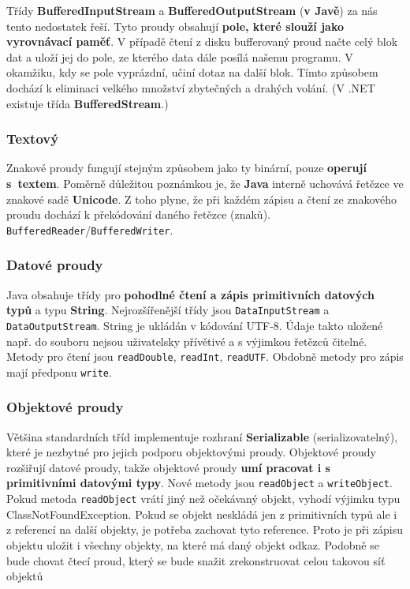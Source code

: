 Třídy \textbf{BufferedInputStream} a \textbf{BufferedOutputStream} (\textbf{v Javě}) za nás tento nedostatek řeší. Tyto proudy obsahují \textbf{pole, které slouží jako vyrovnávací paměť}. V případě čtení z disku bufferovaný proud načte celý blok dat a uloží jej do pole, ze kterého data dále posílá našemu programu. V okamžiku, kdy se pole vyprázdní, učiní dotaz na další blok. Tímto způsobem dochází k eliminaci velkého množství zbytečných a drahých volání. (V .NET existuje třída \textbf{BufferedStream}.)

\subsubsection{Textový}
Znakové proudy fungují stejným způsobem jako ty binární, pouze \textbf{operují s textem}. Poměrně důležitou poznámkou je, že \textbf{Java} interně uchovává řetězce ve znakové sadě \textbf{Unicode}. Z toho plyne, že při každém zápisu a čtení ze znakového proudu dochází k překódování daného řetězce (znaků). \texttt{BufferedReader}/\texttt{BufferedWriter}.

\subsubsection{Datové proudy}
Java obsahuje třídy pro \textbf{pohodlné čtení a zápis primitivních datových typů} a typu \textbf{String}. Nejrozšířenější třídy jsou \texttt{DataInputStream} a \texttt{DataOutputStream}. String je ukládán v kódování UTF-8. Údaje takto uložené např. do souboru nejsou uživatelsky přívětivé a s výjimkou řetězců čitelné. Metody pro čtení jsou \texttt{readDouble}, \texttt{readInt}, \texttt{readUTF}. Obdobně metody pro zápis mají předponu \texttt{write}.

\subsubsection{Objektové proudy}
Většina standardních tříd implementuje rozhraní \textbf{Serializable} (serializovatelný), které je nezbytné pro jejich podporu objektovými proudy. Objektové proudy rozšiřují datové proudy, takže objektové proudy \textbf{umí pracovat i s primitivními datovými typy}. Nové metody jsou \texttt{readObject} a \texttt{writeObject}. Pokud metoda \texttt{readObject} vrátí jiný než očekávaný objekt, vyhodí výjimku typu ClassNotFoundException. Pokud se objekt neskládá jen z primitivních typů ale i z referencí na další objekty, je potřeba zachovat tyto reference. Proto je při zápisu objektu uložit i všechny objekty, na které má daný objekt odkaz. Podobně se bude chovat čtecí proud, který se bude snažit zrekonstruovat celou takovou síť objektů

